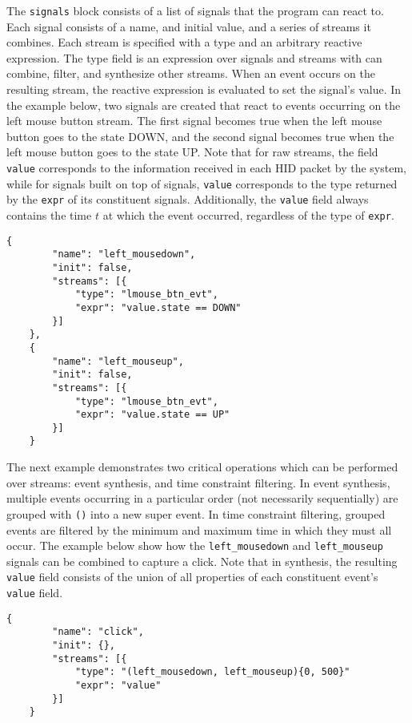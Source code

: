 \documentclass{article}
\begin{document}
The \texttt{signals} block consists of a list of signals that the program can react to.
Each signal consists of a name, and initial value, and a series of streams it combines. Each stream is specified with a type and an arbitrary reactive expression. The type field is an expression over signals and streams with can combine, filter, and synthesize other streams. When an event occurs on the resulting stream, the reactive expression is evaluated to set the signal's value. In the example below, two signals are created that react to events occurring on the left mouse button stream. The first signal becomes true when the left mouse button goes to the state DOWN, and the second signal becomes true when the left mouse button goes to the state UP. Note that for raw streams, the field \texttt{value} corresponds to the information received in each HID packet by the system, while for signals built on top of signals, \texttt{value} corresponds to the type returned by the \texttt{expr} of its constituent signals. Additionally, the \texttt{value} field always contains the time $t$ at which the event occurred, regardless of the type of \texttt{expr}.

\begin{Verbatim}[baselinestretch=1.0]
    {
        "name": "left_mousedown",
        "init": false,
        "streams": [{
            "type": "lmouse_btn_evt",
            "expr": "value.state == DOWN"
        }]
    },
    {
        "name": "left_mouseup",
        "init": false,
        "streams": [{
            "type": "lmouse_btn_evt",
            "expr": "value.state == UP"
        }]
    }
\end{Verbatim}

The next example demonstrates two critical operations which can be performed over streams: event synthesis, and time constraint filtering.
In event synthesis, multiple events occurring in a particular order (not necessarily sequentially) are grouped with \texttt{()} into a new super event. In time constraint filtering, grouped events are filtered by the minimum and maximum time in which they must all occur. The example below show how the \texttt{left\_mousedown} and \texttt{left\_mouseup} signals can be combined to capture a click. Note that in synthesis, the resulting \texttt{value} field consists of the union of all properties of each constituent event's \texttt{value} field.

\begin{Verbatim}[baselinestretch=1.0]
    {
        "name": "click",
        "init": {},
        "streams": [{
            "type": "(left_mousedown, left_mouseup){0, 500}"
            "expr": "value"
        }]
    }
\end{Verbatim}
\end{document}
